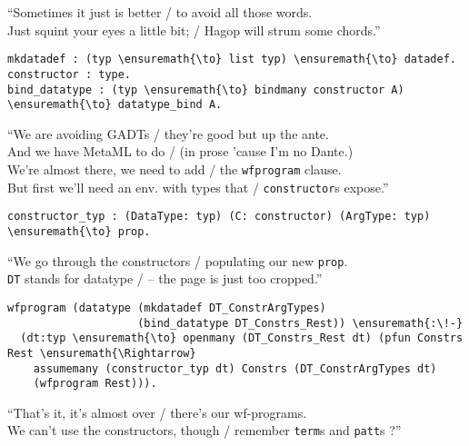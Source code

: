 \begin{versy}
``Sometimes it just is better / to avoid all those words. \\
Just squint your eyes a little bit; / Hagop will strum some chords.''
\end{versy}

\begin{verbatim}
mkdatadef : (typ \ensuremath{\to} list typ) \ensuremath{\to} datadef.
constructor : type.
bind_datatype : (typ \ensuremath{\to} bindmany constructor A) \ensuremath{\to} datatype_bind A.
\end{verbatim}

\begin{versy}
``We are avoiding GADTs / they're good but up the ante. \\
And we have MetaML to do / (in prose 'cause I'm no Dante.) \\
We're almost there, we need to add / the \texttt{wfprogram} clause. \\
But first we'll need an env. with types that / \texttt{constructor}s expose.''
\end{versy}

\begin{verbatim}
constructor_typ : (DataType: typ) (C: constructor) (ArgType: typ) \ensuremath{\to} prop.
\end{verbatim}

\begin{versy}
``We go through the constructors / populating our new \texttt{prop}. \\
\texttt{DT} stands for datatype / -- the page is just too cropped.''
\end{versy}

\importantCodeblock{}

\begin{verbatim}
wfprogram (datatype (mkdatadef DT_ConstrArgTypes)
                    (bind_datatype DT_Constrs_Rest)) \ensuremath{:\!-}
  (dt:typ \ensuremath{\to} openmany (DT_Constrs_Rest dt) (pfun Constrs Rest \ensuremath{\Rightarrow}
    assumemany (constructor_typ dt) Constrs (DT_ConstrArgTypes dt)
    (wfprogram Rest))).
\end{verbatim}

\importantCodeblockEnd{}

\begin{versy}
``That's it, it's almost over / there's our wf-programs. \\
We can't use the constructors, though / remember \texttt{term}s and \texttt{patt}s ?''
\end{versy}

